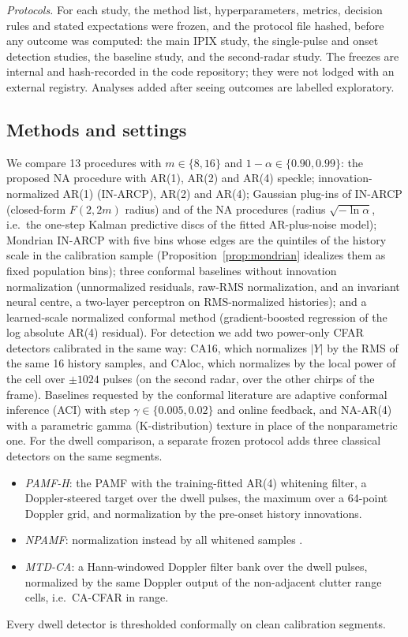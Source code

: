 \documentclass[journal]{IEEEtran}
\begin{document}
\emph{Protocols.} For each study, the method list, hyperparameters, metrics, decision rules and stated expectations were frozen, and the protocol file hashed, before any outcome was computed: the main IPIX study, the single-pulse and onset detection studies, the baseline study, and the second-radar study. The freezes are internal and hash-recorded in the code repository; they were not lodged with an external registry. Analyses added after seeing outcomes are labelled exploratory.

\subsection{Methods and settings}
We compare 13 procedures with $m\in\{8,16\}$ and $1-\alpha\in\{0.90,0.99\}$: the proposed NA procedure with AR(1), AR(2) and AR(4) speckle; innovation-normalized AR(1) (IN-ARCP), AR(2) and AR(4); Gaussian plug-ins of IN-ARCP (closed-form $F(2,2m)$ radius) and of the NA procedures (radius $\sqrt{-\ln\alpha}$, i.e.\ the one-step Kalman predictive discs of the fitted AR-plus-noise model); Mondrian IN-ARCP with five bins whose edges are the quintiles of the history scale in the calibration sample (Proposition~\ref{prop:mondrian} idealizes them as fixed population bins); three conformal baselines without innovation normalization (unnormalized residuals, raw-RMS normalization, and an invariant neural centre, a two-layer perceptron on RMS-normalized histories); and a learned-scale normalized conformal method (gradient-boosted regression of the log absolute AR(4) residual). For detection we add two power-only CFAR detectors calibrated in the same way: CA16, which normalizes $|Y|$ by the RMS of the same 16 history samples, and CAloc, which normalizes by the local power of the cell over $\pm1024$ pulses (on the second radar, over the other chirps of the frame). Baselines requested by the conformal literature are adaptive conformal inference (ACI) \cite{gibbs2021aci} with step $\gamma\in\{0.005,0.02\}$ and online feedback, and NA-AR(4) with a parametric gamma (K-distribution) texture in place of the nonparametric one. For the dwell comparison, a separate frozen protocol adds three classical detectors on the same segments.
\begin{itemize}[leftmargin=*,itemsep=1pt]
\item \emph{PAMF-H}: the PAMF \cite{roman2000} with the training-fitted AR(4) whitening filter, a Doppler-steered target over the dwell pulses, the maximum over a 64-point Doppler grid, and normalization by the pre-onset history innovations.
\item \emph{NPAMF}: normalization instead by all whitened samples \cite{michels2000}.
\item \emph{MTD-CA}: a Hann-windowed Doppler filter bank over the dwell pulses, normalized by the same Doppler output of the non-adjacent clutter range cells, i.e.\ CA-CFAR in range.
\end{itemize}
Every dwell detector is thresholded conformally on clean calibration segments.
\end{document}

